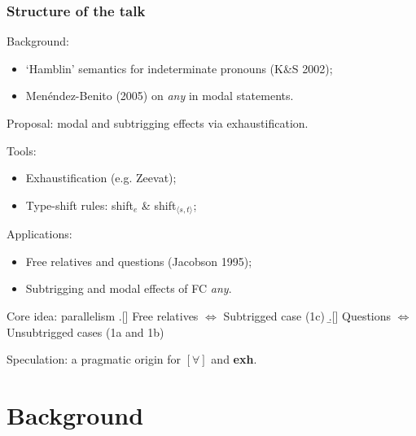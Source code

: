 \documentclass{beamer}
\newcommand\notext[1]{}
\newcommand{\bit}{\begin{itemize}}
\newcommand{\eit}{\end{itemize}}
\newcommand{\ben}{\begin{enumerate}}
\newcommand{\een}{\end{enumerate}}
\begin{document}
 \notext{There are by now a number of satisfactory explanation of the contrast between (a) and (b). Satisfactory means  distribution and the meaning get a uniform explanation. But no satisfactory explanation of (c) }
 \frame
{
\frametitle{Structure of the talk}

\ben \notext{\pause} \item Background:

\bit
 \item   `Hamblin'  semantics for indeterminate pronouns (K\&S 2002);
 \item Men\'endez-Benito (2005) on \emph{any} in modal statements.
 
 \eit
 \notext{\pause} \item Proposal:  modal and subtrigging effects via exhaustification.
 \bit
 \notext{\pause} \item Tools:
 \bit
  \item Exhaustification (e.g. Zeevat);
  \item Type-shift rules: {\sc shift}$_{e}$ \& {\sc shift}$_{\langle  s,t \rangle}$;

 \eit
 \notext{\pause} \item Applications:
 \bit
 \item    Free relatives and questions  (Jacobson 1995); 
  \item   Subtrigging and modal effects of FC {\it any}.
 
 \eit
{\small  \item Core idea: parallelism   
 \a.[] Free relatives $\Leftrightarrow$ Subtrigged case (1c)
 \b.[]  Questions  $\Leftrightarrow$ Unsubtrigged cases (1a and 1b)
 
 }
 
 
 
\eit
\notext{\pause} \item Speculation: a pragmatic origin for $[\forall]$ and  {\bf exh}.

\een


}

\section{Background}
\end{document}
